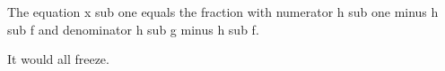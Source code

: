 The equation x sub one equals the fraction with numerator h sub one minus h sub f and denominator h sub g minus h sub f.

It would all freeze.